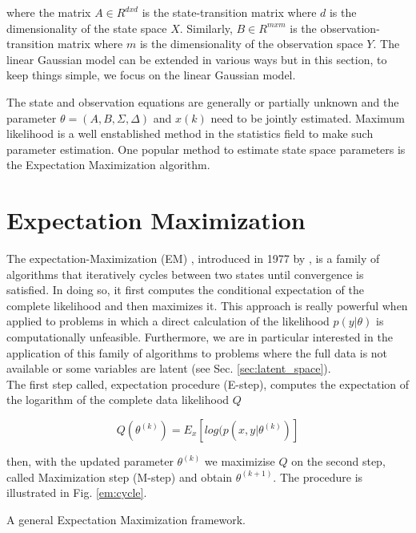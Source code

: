 \documentclass[mscthesis]{usiinfthesis}
\begin{document}
where the matrix $A \in R^{dxd}$ is the state-transition matrix where $d$ is the dimensionality of the state space $X$. Similarly, $B \in R^{mxm}$ is the observation-transition matrix where $m$ is the dimensionality of the observation space $Y$. The linear Gaussian model can be extended in various ways but in this section, to keep things simple, we focus on the linear Gaussian model. 

The state and observation equations are generally or partially unknown and the parameter $\theta=(A, B, \Sigma, \Delta)$ and $x(k)$ need to be jointly estimated. Maximum likelihood is a well enstablished method in the statistics field to make such parameter estimation. One popular method to estimate state space parameters is the Expectation Maximization algorithm.

\section{Expectation Maximization}
\label{sec:em}

The expectation-Maximization (EM) , introduced in 1977 by \citet{paper:dempster}, is a family of algorithms that iteratively cycles between two states until convergence is satisfied. In doing so, it first computes the conditional expectation of the complete likelihood and then maximizes it. This approach is really powerful when applied to problems in which a direct calculation of the likelihood $p(y|\theta)$ is computationally unfeasible. Furthermore, we are in particular interested in the application of this family of algorithms to problems where the full data is not available or some variables are latent (see Sec. \ref{sec:latent_space}). \\

The first step called, expectation procedure (E-step), computes the expectation of the logarithm of the complete data likelihood $Q$

\[
Q(\theta^{(k)}) = E_{x} \left[ log(p(x, y | \theta^{(k)}) \right]
\]

then, with the updated parameter $\theta^{(k)}$ we maximizise $Q$ on the second step, called Maximization step (M-step) and obtain $\theta^{(k+1)}$. The procedure is illustrated in Fig. \ref{em:cycle}. 

\begin{algorithm}[h]
  \label{em:cycle}
  \caption{A general Expectation Maximization framework.}
\end{algorithm}
\end{document}
